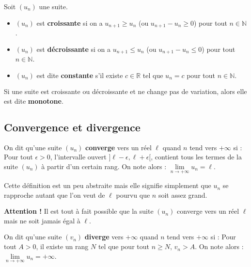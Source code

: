 	\begin{formula}[Définition]
		Soit $(u_n)$ une suite.
		\begin{itemize}
			\item $(u_n)$ est \textbf{croissante} si on a $u_{n+1} \geq u_n$ (ou $u_{n+1} - u_n \geq 0$) pour tout $n \in \mathbb{N}$.
			\item $(u_n)$ est \textbf{décroissante} si on a $u_{n+1} \leq u_n$ (ou $u_{n+1} - u_n \leq 0$) pour tout $n \in \mathbb{N}$.
			\item $(u_n)$ est dite \textbf{constante} s'il existe $c \in \mathbb{R}$ tel que $u_n = c$ pour tout $n \in \mathbb{N}$.
		\end{itemize}
	\end{formula}

	Si une suite est croissante ou décroissante et ne change pas de variation, alors elle est dite \textbf{monotone}.

	\subsection{Convergence et divergence}

	\begin{formula}[Convergence]
		On dit qu'une suite $(u_n)$ \textbf{converge} vers un réel $\ell$ quand $n$ tend vers $+\infty$ si :
		\newpar
		Pour tout $\epsilon > 0$, l'intervalle ouvert $]\ell-\epsilon, \ell+\epsilon[$, contient tous les termes de la suite $(u_n)$ à partir d'un certain rang. On note alors : $\lim\limits_{n \rightarrow +\infty} u_n = \ell$.
	\end{formula}

	\begin{tip}
		Cette définition est un peu abstraite mais elle signifie simplement que $u_n$ se rapproche autant que l'on veut de $\ell$ pourvu que $n$ soit assez grand.
	\end{tip}

	\textbf{Attention !} Il est tout à fait possible que la suite $(u_n)$ converge vers un réel $\ell$ mais ne soit jamais égal à $\ell$.

	\begin{formula}
		On dit qu'une suite $(v_n)$ \textbf{diverge} vers $+\infty$ quand $n$ tend vers $+\infty$ si :
		\newpar
		Pour tout $A > 0$, il existe un rang $N$ tel que pour tout $n \geq N$, $v_n > A$. On note alors : $\lim\limits_{n \rightarrow +\infty} u_n = +\infty$.
	\end{formula}

